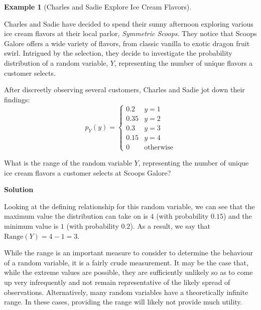 \documentclass[
  letterpaper,
  DIV=11,
  numbers=noendperiod]{scrreprt}
\theoremstyle{definition}
\theoremstyle{definition}
\newtheorem{example}{Example}[chapter]
\theoremstyle{definition}
\theoremstyle{remark}
\begin{document}
\begin{example}[Charles and Sadie Explore Ice Cream
Flavors]\protect\hypertarget{exm-range-works}{}\label{exm-range-works}

Charles and Sadie have decided to spend their sunny afternoon exploring
various ice cream flavors at their local parlor, \emph{Symmetric
Scoops}. They notice that Scoops Galore offers a wide variety of
flavors, from classic vanilla to exotic dragon fruit swirl. Intrigued by
the selection, they decide to investigate the probability distribution
of a random variable, \(Y\), representing the number of unique flavors a
customer selects.

After discreetly observing several customers, Charles and Sadie jot down
their findings: \[
p_Y(y) = \begin{cases} 
0.2 & y = 1 \\
0.35 & y = 2 \\
0.3 & y = 3 \\
0.15 & y = 4 \\
0 & \text{otherwise}
\end{cases}
\]

What is the range of the random variable \(Y\), representing the number
of unique ice cream flavors a customer selects at Scoops Galore?

\begin{tcolorbox}[enhanced jigsaw, colback=white, colframe=quarto-callout-color-frame, arc=.35mm, leftrule=.75mm, rightrule=.15mm, opacityback=0, breakable, bottomrule=.15mm, left=2mm, toprule=.15mm]

\vspace{-3mm}\textbf{Solution}\vspace{3mm}

Looking at the defining relationship for this random variable, we can
see that the maximum value the distribution can take on is \(4\) (with
probability \(0.15\)) and the minimum value is \(1\) (with probability
\(0.2\)). As a result, we say that \(\text{Range}(Y) = 4 - 1 = 3\).

\end{tcolorbox}

\end{example}

While the range is an important measure to consider to determine the
behaviour of a random variable, it is a fairly crude measurement. It may
be the case that, while the extreme values are possible, they are
sufficiently unlikely so as to come up very infrequently and not remain
representative of the likely spread of observations. Alternatively, many
random variables have a theoretically infinite range. In these cases,
providing the range will likely not provide much utility.
\end{document}
